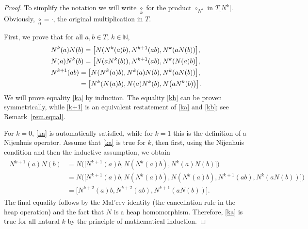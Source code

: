 \documentclass[10pt,a4paper]{amsart}
\numberwithin{equation}{section}
\newcommand{\N}{\mathbb N}
\def\nij#1{{\underset{#1}{\circ}}}
\begin{document}
\begin{proof}
To simplify the notation we will write $\nij k$ for the product $\circ_{N^k}$ in $T\big[N^k\big]$. Obviously, $\nij 0 =\cdot$, the original multiplication in $T$.

First, we prove that for all $a,b\in T$, $k\in \N$,
\begin{subequations}\label{k-power}
\begin{align}
&N^k(a)N(b) = \big[N(N^k(a)b),N^{k+1}(ab),N^k(aN(b))\big],\label{ka}\\
&N(a)N^k(b) = \big[N(aN^k(b)),N^{k+1}(ab),N^k(N(a)b)\big],\label{kb}\\
&N^{k+1}(ab) = \big[N(N^k(a)b),N^k(a)N(b),N^k(aN(b))\big],\nonumber\\
&\hphantom{N^{k+1}(ab)}{} = \big[N^k(N(a)b),N(a)N^k(b) ,N\big(aN^k(b)\big)\big].\label{k+1}
\end{align}
\end{subequations}
We will prove equality \eqref{ka} by induction. The equality \eqref{kb} can be proven symmetrically, while \eqref{k+1} is an equivalent restatement of \eqref{ka} and \eqref{kb}; see Remark~\ref{rem.equal}.

For $k=0$, \eqref{ka} is automatically satisfied, while for $k=1$ this is the definition of a Nijenhuis operator. Assume that \eqref{ka} is true for $k$, then first, using the Nijenhuis condition and then the inductive assumption, we obtain
\begin{align*}
\begin{split}
 N^{k+1}(a)N(b) &= N\big(\big[N^{k+1}(a)b, N(N^k(a)b), N^k(a)N(b)\big]\big)\\
 &= N\big(\big[N^{k+1}(a)b, N(N^k(a)b), N(N^k(a)b),N^{k+1}(ab),N^k(aN(b))\big]\big)\\
 &= \big[N^{k+2}(a)b,N^{k+2}(ab),N^{k+1}(aN(b))\big].
\end{split}
\end{align*}
The final equality follows by the Mal'cev identity (the cancellation rule in the heap operation) and the fact that $N$ is a heap homomorphism. Therefore, \eqref{ka} is true for all natural $k$ by the principle of mathematical induction.


\end{proof}
\end{document}
